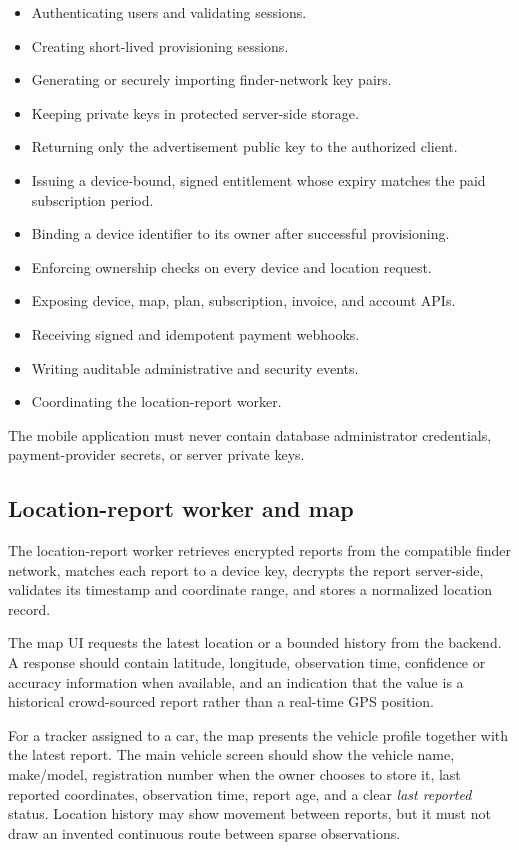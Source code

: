 \documentclass[12pt,a4paper]{article}
\begin{document}
\begin{itemize}
    \item Authenticating users and validating sessions.
    \item Creating short-lived provisioning sessions.
    \item Generating or securely importing finder-network key pairs.
    \item Keeping private keys in protected server-side storage.
    \item Returning only the advertisement public key to the authorized client.
    \item Issuing a device-bound, signed entitlement whose expiry matches the
    paid subscription period.
    \item Binding a device identifier to its owner after successful
    provisioning.
    \item Enforcing ownership checks on every device and location request.
    \item Exposing device, map, plan, subscription, invoice, and account APIs.
    \item Receiving signed and idempotent payment webhooks.
    \item Writing auditable administrative and security events.
    \item Coordinating the location-report worker.
\end{itemize}

The mobile application must never contain database administrator credentials,
payment-provider secrets, or server private keys.

\subsection{Location-report worker and map}

The location-report worker retrieves encrypted reports from the compatible
finder network, matches each report to a device key, decrypts the report
server-side, validates its timestamp and coordinate range, and stores a
normalized location record.

The map UI requests the latest location or a bounded history from the backend.
A response should contain latitude, longitude, observation time, confidence or
accuracy information when available, and an indication that the value is a
historical crowd-sourced report rather than a real-time GPS position.

For a tracker assigned to a car, the map presents the vehicle profile together
with the latest report. The main vehicle screen should show the vehicle name,
make/model, registration number when the owner chooses to store it, last
reported coordinates, observation time, report age, and a clear
\textit{last reported} status. Location history may show movement between
reports, but it must not draw an invented continuous route between sparse
observations.
\end{document}
